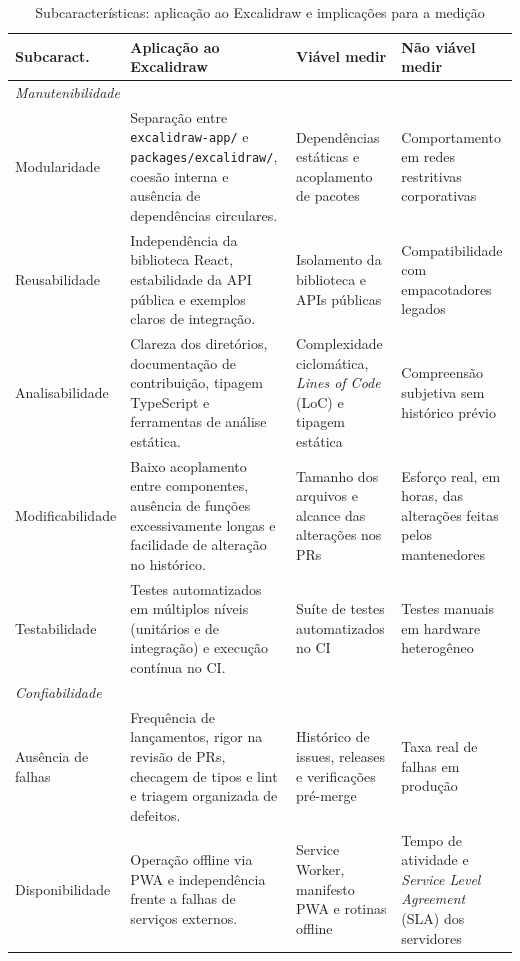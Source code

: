 \documentclass[12pt]{article}
\begin{document}
\begin{table}[!ht]
\centering
\caption{Subcaracterísticas: aplicação ao Excalidraw e implicações para a medição}
\label{tab:subcaracteristicas}
\vspace{4pt}
\scriptsize
\setlength{\tabcolsep}{3pt}
\begin{tabular}{p{2.2cm}p{6.6cm}p{3.6cm}p{3.6cm}}
\toprule
\textbf{Subcaract.} & \textbf{Aplicação ao Excalidraw} & \textbf{Viável medir} & \textbf{Não viável medir} \\
\midrule
\multicolumn{4}{l}{\textit{Manutenibilidade}} \\
Modularidade      & Separação entre \texttt{excalidraw-app/} e \texttt{packages/excalidraw/}, coesão interna e ausência de dependências circulares. & Dependências estáticas e acoplamento de pacotes & Comportamento em redes restritivas corporativas \\
Reusabilidade     & Independência da biblioteca React, estabilidade da API pública e exemplos claros de integração. & Isolamento da biblioteca e APIs públicas & Compatibilidade com empacotadores legados \\
Analisabilidade   & Clareza dos diretórios, documentação de contribuição, tipagem TypeScript e ferramentas de análise estática. & Complexidade ciclomática, \textit{Lines of Code} (LoC) e tipagem estática & Compreensão subjetiva sem histórico prévio \\
Modificabilidade  & Baixo acoplamento entre componentes, ausência de funções excessivamente longas e facilidade de alteração no histórico. & Tamanho dos arquivos e alcance das alterações nos PRs & Esforço real, em horas, das alterações feitas pelos mantenedores \\
Testabilidade     & Testes automatizados em múltiplos níveis (unitários e de integração) e execução contínua no CI. & Suíte de testes automatizados no CI & Testes manuais em hardware heterogêneo \\
\midrule
\multicolumn{4}{l}{\textit{Confiabilidade}} \\
Ausência de falhas & Frequência de lançamentos, rigor na revisão de PRs, checagem de tipos e lint e triagem organizada de defeitos. & Histórico de issues, releases e verificações pré-merge & Taxa real de falhas em produção \\
Disponibilidade   & Operação offline via PWA e independência frente a falhas de serviços externos. & Service Worker, manifesto PWA e rotinas offline & Tempo de atividade e \textit{Service Level Agreement} (SLA) dos servidores \\

\end{tabular}
\end{table}
\end{document}
